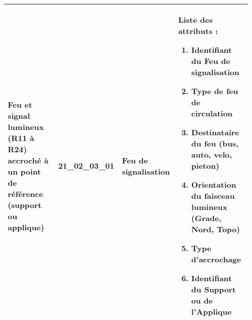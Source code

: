\documentclass[12pt,titlepage]{book}
\begin{document}
\renewcommand{\arraystretch}{1.2}
\begin{supertabular}{|p{10cm}|c|p{13cm}|p{12cm}|}
 Feu et signal lumineux (R11 à R24) accroché à un point de référence (support ou applique) & 21\_02\_03\_01 & Feu de signalisation & Liste des attributs :
\begin{enumerate}
  \item Identifiant du Feu de signalisation  \item Type de feu de circulation  \item Destinataire du feu (bus, auto, velo, pieton)  \item Orientation du faisceau lumineux (Grade, Nord, Topo)  \item Type d'accrochage  \item Identifiant du Support ou de l'Applique\end{enumerate}
\\
\hline
\end{supertabular}
\end{document}
